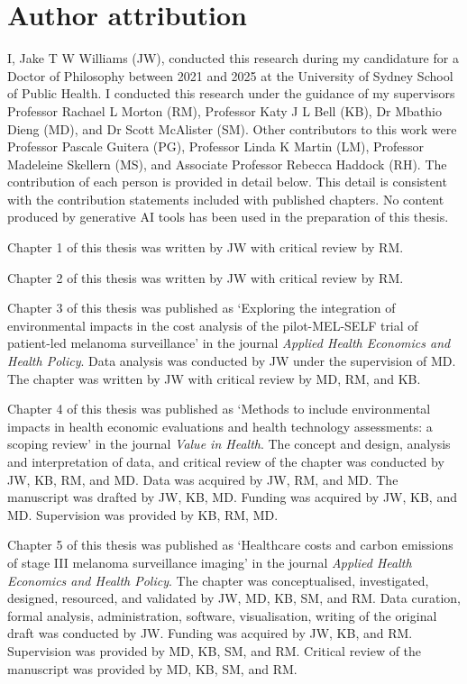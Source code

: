\chapter{Author attribution}

I, Jake T W Williams (JW), conducted this research during my candidature for a Doctor of Philosophy between 2021 and 2025 at the University of Sydney School of Public Health. I conducted this research under the guidance of my supervisors Professor Rachael L Morton (RM), Professor Katy J L Bell (KB), Dr Mbathio Dieng (MD), and Dr Scott McAlister (SM). Other contributors to this work were Professor Pascale Guitera (PG), Professor Linda K Martin (LM), Professor Madeleine Skellern (MS), and Associate Professor Rebecca Haddock (RH). The contribution of each person is provided in detail below. This detail is consistent with the contribution statements included with published chapters. No content produced by generative AI tools has been used in the preparation of this thesis.

Chapter 1 of this thesis was written by JW with critical review by RM.

Chapter 2 of this thesis was written by JW with critical review by RM.

Chapter 3 of this thesis was published as `Exploring the integration of environmental impacts in the cost analysis of the pilot-MEL-SELF trial of patient-led melanoma surveillance' in the journal \textit{Applied Health Economics and Health Policy}. Data analysis was conducted by JW under the supervision of MD. The chapter was written by JW with critical review by MD, RM, and KB.

Chapter 4 of this thesis was published as `Methods to include environmental impacts in health economic evaluations and health technology assessments: a scoping review' in the journal \textit{Value in Health}. The concept and design, analysis and interpretation of data, and critical review of the chapter was conducted by JW, KB, RM, and MD. Data was acquired by JW, RM, and MD. The manuscript was drafted by JW, KB, MD. Funding was acquired by JW, KB, and MD. Supervision was provided by KB, RM, MD.

Chapter 5 of this thesis was published as `Healthcare costs and carbon emissions of stage III melanoma surveillance imaging' in the journal \textit{Applied Health Economics and Health Policy}. The chapter was conceptualised, investigated, designed, resourced, and validated by JW, MD, KB, SM, and RM. Data curation, formal analysis, administration, software, visualisation, writing of the original draft was conducted by JW. Funding was acquired by JW, KB, and RM. Supervision was provided by MD, KB, SM, and RM. Critical review of the manuscript was provided by MD, KB, SM, and RM. 

